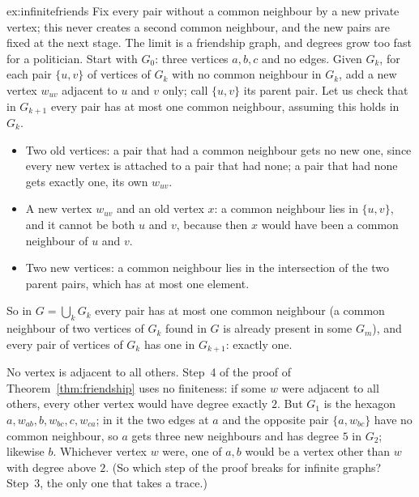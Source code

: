 \begin{solution}{ex:infinitefriends}
\idea Fix every pair without a common neighbour by a new private vertex; this never creates a second common neighbour, and the new
pairs are fixed at the next stage. The limit is a friendship graph, and degrees grow too fast for a politician.
\writeup Start with $G_0$: three vertices $a,b,c$ and no edges. Given $G_k$, for each pair $\{u,v\}$ of vertices of $G_k$ with no
common neighbour in $G_k$, add a new vertex $w_{uv}$ adjacent to $u$ and $v$ only; call $\{u,v\}$ its parent pair. Let us check
that in $G_{k+1}$ every pair has at most one common neighbour, assuming this holds in $G_k$.
\begin{itemize}
\item Two old vertices: a pair that had a common neighbour gets no new one, since every new vertex is attached to a pair that had
none; a pair that had none gets exactly one, its own $w_{uv}$.
\item A new vertex $w_{uv}$ and an old vertex $x$: a common neighbour lies in $\{u,v\}$, and it cannot be both $u$ and $v$, because
then $x$ would have been a common neighbour of $u$ and $v$.
\item Two new vertices: a common neighbour lies in the intersection of the two parent pairs, which has at most one element.
\end{itemize}
So in $G=\bigcup_kG_k$ every pair has at most one common neighbour (a common neighbour of two vertices of $G_k$ found in $G$ is
already present in some $G_m$), and every pair of vertices of $G_k$ has one in $G_{k+1}$: exactly one.

No vertex is adjacent to all others. Step~4 of the proof of Theorem~\ref{thm:friendship} uses no finiteness: if some $w$ were
adjacent to all others, every other vertex would have degree exactly $2$. But $G_1$ is the hexagon $a,w_{ab},b,w_{bc},c,w_{ca}$; in
it the two edges at $a$ and the opposite pair $\{a,w_{bc}\}$ have no common neighbour, so $a$ gets three new neighbours and has
degree $5$ in $G_2$; likewise $b$. Whichever vertex $w$ were, one of $a,b$ would be a vertex other than $w$ with
degree above $2$. (So which step of the proof breaks for infinite graphs? Step~3, the only one that takes a trace.)
\end{solution}


